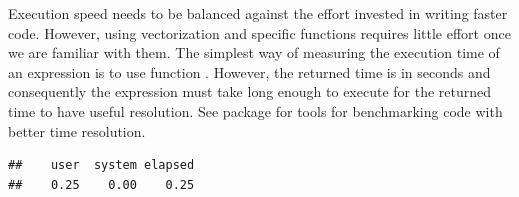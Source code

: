 \documentclass[krantz2]{krantz}\usepackage{knitr}%
\begin{document}
Execution speed needs to be balanced against the effort invested in writing faster code. However, using vectorization and specific \Rlang functions requires little effort once we are familiar with them. The simplest way of measuring the execution time of an \Rlang expression is to use function . However, the returned time is in seconds and consequently the expression must take long enough to execute for the returned time to have useful resolution. See package  for tools for benchmarking code with better time resolution.

\begin{knitrout}\footnotesize
{}\color{fgcolor}\begin{kframe}
\begin{alltt}
 \hlkwb{<-} \hlstd{()}
               \hlopt{:}\hlstd{) \{}
               \hlkwb{<-}  \hlopt{/} 
              \hlstd{\}}
            \hlstd{\})}
\end{alltt}
\begin{verbatim}
##    user  system elapsed 
##    0.25    0.00    0.25
\end{verbatim}
\end{kframe}
\end{knitrout}
\end{document}
